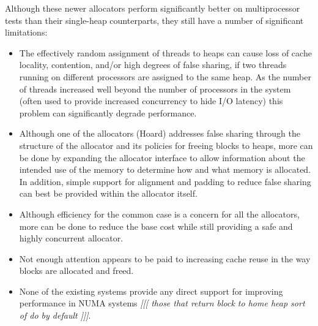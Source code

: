 \documentclass[dvips,11pt]{article}
\newcommand\fixnote[1]{\emph{[[[ #1 ]]]}}
\begin{document}
Although these newer allocators perform significantly better on
multiprocessor tests than their single-heap counterparts, they still have a 
number of significant limitations:
\begin{itemize}
\item The effectively random assignment of threads to heaps can cause loss of
  cache locality, contention, and/or high degrees of false sharing, if two
  threads running on different processors are assigned to the same heap.
  As the number of threads increased well beyond the number of processors
  in the system (often used to provide increased concurrency to hide I/O
  latency) this problem can significantly degrade performance.
\item Although one of the allocators (Hoard) addresses false sharing
  through the structure of the allocator and its policies for freeing
  blocks to heaps, more can be done by expanding the allocator interface to
  allow information about the intended use of the memory to determine how
  and what memory is allocated.  In addition, simple support for alignment
  and padding to reduce false sharing can best be provided within the
  allocator itself.
\item Although efficiency for the common case is a concern for all the
  allocators, more can be done to reduce the base cost while still
  providing a safe and highly concurrent allocator.
\item Not enough attention appears to be paid to increasing cache reuse in
  the way blocks are allocated and freed.
\item None of the existing systems provide any direct support for improving
  performance in NUMA systems \fixnote{those that return block to home heap
    sort of do by default}.
\end{itemize}
\end{document}
